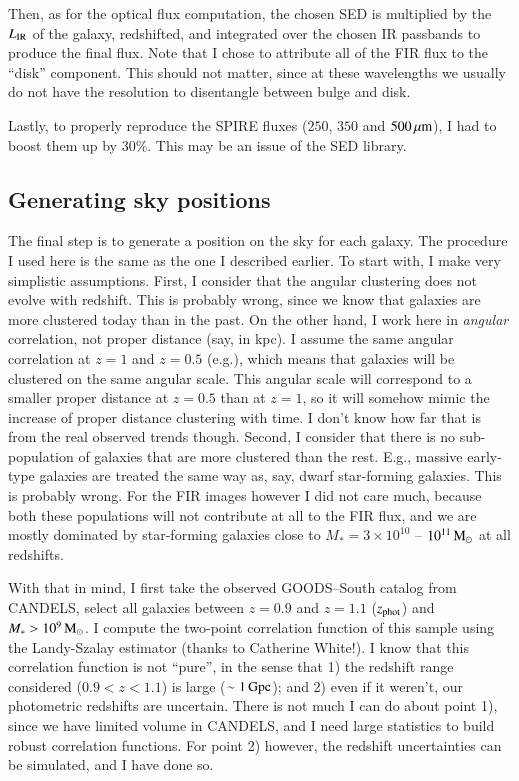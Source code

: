 \documentclass[12pt,a4paper]{article}
\newcommand{\um}{\mu{\rm m}}
\newcommand{\lir}{L_{\rm IR}}
\newcommand{\msun}{{\rm M}_\odot}
\newcommand{\mstar}{M_\ast}
\begin{document}
Then, as for the optical flux computation, the chosen SED is multiplied by the $\lir$ of the galaxy, redshifted, and integrated over the chosen IR passbands to produce the final flux. Note that I chose to attribute all of the FIR flux to the ``disk'' component. This should not matter, since at these wavelengths we usually do not have the resolution to disentangle between bulge and disk.

Lastly, to properly reproduce the SPIRE fluxes ($250$, $350$ and $500\,\um$), I had to boost them up by $30\%$. This may be an issue of the SED library.


\subsection{Generating sky positions}

The final step is to generate a position on the sky for each galaxy. The procedure I used here is the same as the one I described earlier. To start with, I make very simplistic assumptions. First, I consider that the angular clustering does not evolve with redshift. This is probably wrong, since we know that galaxies are more clustered today than in the past. On the other hand, I work here in \emph{angular} correlation, not proper distance (say, in kpc). I assume the same angular correlation at $z=1$ and $z=0.5$ (e.g.), which means that galaxies will be clustered on the same angular scale. This angular scale will correspond to a smaller proper distance at $z=0.5$ than at $z=1$, so it will somehow mimic the increase of proper distance clustering with time. I don't know how far that is from the real observed trends though. Second, I consider that there is no sub-population of galaxies that are more clustered than the rest. E.g., massive early-type galaxies are treated the same way as, say, dwarf star-forming galaxies. This is probably wrong. For the FIR images however I did not care much, because both these populations will not contribute at all to the FIR flux, and we are mostly dominated by star-forming galaxies close to $\mstar = 3\times10^{10}$ -- $10^{11}\,\msun$ at all redshifts.

With that in mind, I first take the observed GOODS--South catalog from CANDELS, select all galaxies between $z=0.9$ and $z=1.1$ ($z_{\rm phot}$) and $\mstar > 10^9\,\msun$. I compute the two-point correlation function of this sample using the Landy-Szalay estimator (thanks to Catherine White!). I know that this correlation function is not ``pure'', in the sense that 1) the redshift range considered ($0.9 < z < 1.1$) is large ($\sim1\,{\rm Gpc}$); and 2) even if it weren't, our photometric redshifts are uncertain. There is not much I can do about point 1), since we have limited volume in CANDELS, and I need large statistics to build robust correlation functions. For point 2) however, the redshift uncertainties can be simulated, and I have done so.
\end{document}

